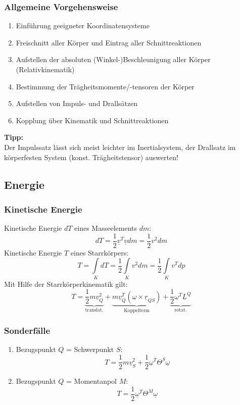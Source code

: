 \documentclass[a4paper,twocolumn,10pt]{article}
\begin{document}
\subsubsection{Allgemeine Vorgehensweise}
\begin{enumerate}
\item Einführung geeigneter Koordinatensysteme
\item Freischnitt aller Körper und Eintrag aller Schnittreaktionen
\item Aufstellen der absoluten (Winkel-)Beschleunigung aller Körper (Relativkinematik)
\item Bestimmung der Trägheitsmomente/-tensoren der Körper
\item Aufstellen von Impuls- und Drallsätzen
\item Kopplung über Kinematik und Schnittreaktionen
\end{enumerate}
\textbf{Tipp:}\\
Der Impulssatz lässt sich meist leichter im Inertialsystem, der Drallsatz im körperfesten System (konst. Trägheitstensor) auswerten!

\subsection{Energie}

\subsubsection{Kinetische Energie}
Kinetische Energie $dT$ eines Masseelements $dm$:
\begin{equation*}
dT=\frac{1}{2}\underline{v}^T\underline{v}dm=\frac{1}{2}v^2dm
\end{equation*}
Kinetische Energie $T$ eines Starrkörpers:
\begin{equation*}
T=\int\limits_KdT=\frac{1}{2}\int\limits_Kv^2dm=\frac{1}{2}\int\limits_Kv^Tdp
\end{equation*}
Mit Hilfe der Starrkörperkinematik gilt:
\begin{equation*}
T=\underbrace{\frac{1}{2}m\underline{v}_Q^2}_{\text{translat.}}+\underbrace{m\underline{v}_Q^T(\underline{\omega}\times\underline{r}_{QS})}_{\text{Koppelterm}}+\underbrace{\frac{1}{2}\underline{\omega}^T\underline{L}^Q}_{\text{rotat.}}
\end{equation*}

\subsubsection{Sonderfälle}
\begin{enumerate}
\item Bezugspunkt $Q$ = Schwerpunkt $S$:
\begin{equation*}
T=\frac{1}{2}m\underline{v}_S^2+\frac{1}{2}\underline{\omega}^T\Theta^S\underline{\omega}
\end{equation*}
\item Bezugspunkt $Q$ = Momentanpol $M$:
\begin{equation*}
T=\frac{1}{2}\underline{\omega}^T\Theta^M\underline{\omega}
\end{equation*}
\end{enumerate}
\end{document}
